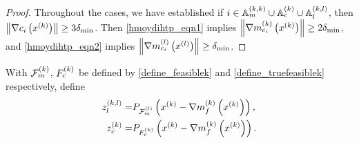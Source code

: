 \begin{proof}



Throughout the cases, we have established if $i \in {\mathbb A_m^{(k, k)}} \cup {\mathbb A_c^{(k)}} \cup {\mathbb A_l^{(k, l)}}$, then $\left\| \nabla c_i\left(x^{(k)}\right) \right\| \ge 3 {\delta_{\textrm{min}}}$.
Then \cref{hmoydihtp_eqn1} implies $\left\|{\nabla m_{c_i}^{(k)}\left(x^{(k)}\right)}\right\| \ge 2 {\delta_{\textrm{min}}}$, 
and \cref{hmoydihtp_eqn2} implies $\left\|{\nabla m_{c_i}^{(l)}\left({x^{(l)}}\right)}\right\| \ge {\delta_{\textrm{min}}}$.
\end{proof}

% 
% 

With ${\mathcal F_m^{(k)}}$, ${F_c^{(k)}}$ be defined by \cref{define_feasiblek} and \cref{define_truefeasiblek} respectively, define
\begin{align}
{z_l^{(k, l)}} =& P_{{\mathcal F_m^{(l)}}}\left(x^{(k)} - {\nabla m_f^{(k)}\left(x^{(k)}\right)}\right), \label{define_zlk} \\
{z_c^{(k)}} =& P_{{F_c^{(k)}}}\left(x^{(k)} - {\nabla m_f^{(k)}\left(x^{(k)}\right)}\right). \label{define_zck}
\end{align}



